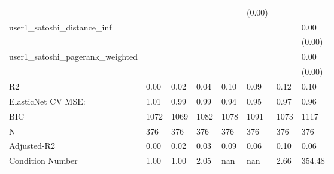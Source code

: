 \begin{table}
\begin{center}
\begin{tabular}{llllllll}
                                               &          &            &         &         & (0.00)   &             &          \\
user1_satoshi_distance_inf                     &          &            &         &         &          &             & 0.00     \\
                                               &          &            &         &         &          &             & (0.00)   \\
user1_satoshi_pagerank_weighted                &          &            &         &         &          &             & 0.00     \\
                                               &          &            &         &         &          &             & (0.00)   \\
R2                                             & 0.00     & 0.02       & 0.04    & 0.10    & 0.09     & 0.12        & 0.10     \\
ElasticNet CV MSE:                             & 1.01     & 0.99       & 0.99    & 0.94    & 0.95     & 0.97        & 0.96     \\
BIC                                            & 1072     & 1069       & 1082    & 1078    & 1091     & 1073        & 1117     \\
N                                              & 376      & 376        & 376     & 376     & 376      & 376         & 376      \\
Adjusted-R2                                    & 0.00     & 0.02       & 0.03    & 0.09    & 0.06     & 0.10        & 0.06     \\
Condition Number                               & 1.00     & 1.00       & 2.05    & nan     & nan      & 2.66        & 354.48   \\
\hline
\end{tabular}
\end{center}
\end{table}